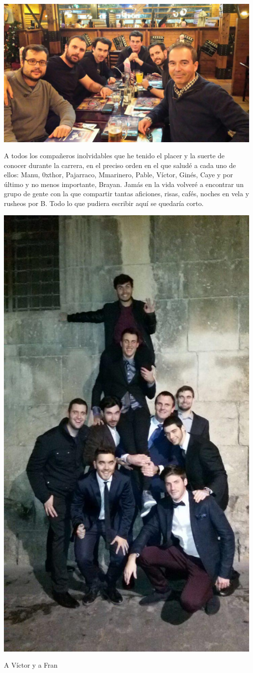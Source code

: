 \begin{center}
	\includegraphics[width=0.75\linewidth]{Figures/Ack/dtic1}
\end{center}

A todos los compañeros inolvidables que he tenido el placer y la suerte de conocer durante la carrera, en el preciso orden en el que saludé a cada uno de ellos: Manu, 0xthor, Pajarraco, Mmarinero, Pable, Víctor, Ginés, Caye y por último y no menos importante, Brayan. Jamás en la vida volveré a encontrar un grupo de gente con la que compartir tantas aficiones, risas, cafés, noches en vela y rusheos por B. Todo lo que pudiera escribir aquí se quedaría corto.

\begin{center}
	\includegraphics[width=0.5\linewidth]{Figures/Ack/bsc1}
\end{center}

A Víctor y a Fran

